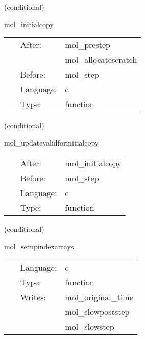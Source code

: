 \vspace{5mm}

   (conditional) 

\hspace{5mm} mol\_initialcopy 

\hspace{5mm}{\it ensure the data is in the correct timelevel } 


\hspace{5mm}

 \begin{tabular*}{160mm}{cll} 
~ & After:  & mol\_prestep \\ 
~& ~ &mol\_allocatescratch\\ 
~ & Before:  & mol\_step \\ 
~ & Language:  & c \\ 
~ & Type:  & function \\ 
\end{tabular*} 


\vspace{5mm}

   (conditional) 

\hspace{5mm} mol\_updatevalidforinitialcopy 

\hspace{5mm}{\it automatically update valid regions based on mol } 


\hspace{5mm}

 \begin{tabular*}{160mm}{cll} 
~ & After:  & mol\_initialcopy \\ 
~ & Before:  & mol\_step \\ 
~ & Language:  & c \\ 
~ & Type:  & function \\ 
\end{tabular*} 


\vspace{5mm}

   (conditional) 

\hspace{5mm} mol\_setupindexarrays 

\hspace{5mm}{\it set up the mol bookkeeping index arrays } 


\hspace{5mm}

 \begin{tabular*}{160mm}{cll} 
~ & Language:  & c \\ 
~ & Type:  & function \\ 
~ & Writes:  & mol\_original\_time \\ 
~& ~ &mol\_slowpoststep\\ 
~& ~ &mol\_slowstep\\ 
\end{tabular*} 


